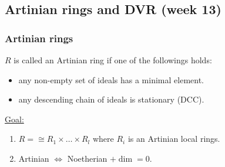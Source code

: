 \subsection{Artinian rings and DVR (week 13)}
\subsubsection{Artinian rings}

\begin{definition}
  $R$ is called an Artinian ring if one of the followings holds:
  \begin{itemize}
    \item any non-empty set of ideals has a minimal element.
    \item any descending chain of ideals is stationary (DCC).
  \end{itemize}
\end{definition}


\underline{Goal:}
\begin{enumerate}
  \item $R = \cong R_1 \times \dots \times R_l$ where $R_i$ is an Artinian
    local rings.
  \item Artinian $\iff$ Noetherian $+ \dim = 0$.
\end{enumerate}

